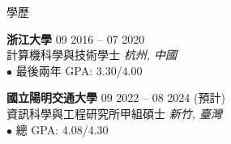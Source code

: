 \documentclass{resume}
\begin{document}
\vspace{-1em}
\begin{rSection}{學歷}

{\bf 浙江大學} \hfill {09 2016 -- 07 2020}\\
計算機科學與技術學士 \hfill \textit{杭州, 中國}\\
$\bullet$ 最後兩年 GPA: 3.30/4.00

{\bf 國立陽明交通大學} \hfill {09 2022 -- 08 2024 (預計)}\\
資訊科學與工程研究所甲組碩士 \hfill \textit{新竹, 臺灣}\\
$\bullet$ 總 GPA: 4.08/4.30

\end{rSection}
\end{document}
